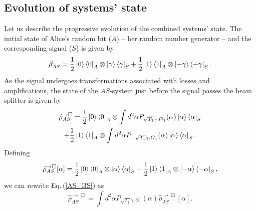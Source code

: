 \documentclass[a4paper]{article}
\begin{document}
\subsection{Evolution of systems' state}
Let us describe the progressive evolution of the combined systems' state.
The initial state of Alice's random bit ($A$) -- her random number generator -- and the corresponding signal ($S$) is given by
%
\begin{equation}
    \hat{\rho}^\text{i}_{AS}= \frac{1}{2}\ket{0}\bra{0}_A \otimes \ket{\gamma}\bra{\gamma}_S +
    \frac{1}{2}\ket{1}\bra{1}_A \otimes \ket{-\gamma}\bra{-\gamma}_S.
\end{equation}
%
As the signal undergoes transformations associated with losses and amplifications, the state of the $AS$-system just before the signal passes the beam splitter is given by
\begin{equation}
\label{AS_BS}
\begin{gathered}
    \hat{\rho}^{\rightarrow \Box}_{AS} =
     \frac{1}{2}\ket{0}\bra{0}_A \otimes \int d^2 \alpha P_{\sqrt{T_1}\gamma, G_1}(\alpha)\ket{\alpha}\bra{\alpha}_S\\ +
    \frac{1}{2}\ket{1}\bra{1}_A \otimes \int d^2 \alpha P_{-\sqrt{T_1}\gamma, G_1}(\alpha)\ket{\alpha}\bra{\alpha}_S.
\end{gathered}
\end{equation}
Defining 
\begin{equation}
\begin{gathered}
    \hat{\rho}^{\rightarrow \Box}_{AS}[\alpha] = 
    \frac{1}{2} \ket{0}\bra{0}_A \otimes \ket{\alpha}\bra{\alpha}_S + \frac{1}{2} \ket{1}\bra{1}_A \otimes \ket{-\alpha}\bra{-\alpha}_S,
\end{gathered}
\end{equation}
we can rewrite Eq.\,(\ref{AS_BS}) as
\begin{equation}
    \hat{\rho}^{\rightarrow \Box}_{AS} = \int d^2 \alpha P_{\sqrt{T_1}\gamma, G_1}(\alpha)\hat{\rho}^{\rightarrow \Box}_{AS}[\alpha].
\end{equation}
\end{document}
